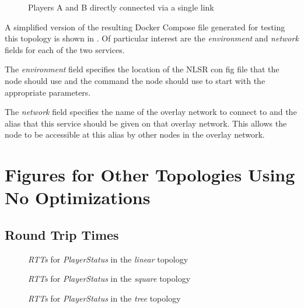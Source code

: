 \begin{appendices}
\begin{figure}[H]
    \centering
    \caption{Players A and B directly connected via a single link}
    \label{fig:app:docker-l2}
\end{figure}

A simplified version of the resulting Docker Compose file generated for testing this topology is shown in . Of particular interest are the \textit{environment} and \textit{network} fields for each of the two services. 

The \textit{environment} field specifies the location of the NLSR con fig file that the node should use and the command the node should use to start \game{} with the appropriate parameters.

The \textit{network} field specifies the name of the overlay network to connect to and the alias that this service should be given on that overlay network. This allows the node to be accessible at this alias by other nodes in the overlay network.







\chapter{Figures for Other Topologies Using No Optimizations}\label{app:eval:basic}
\section{Round Trip Times}
\begin{figure}[H]
    \centering
    \caption{\textit{RTTs} for \textit{PlayerStatus} in the \textit{linear} topology}
    \label{fig:app:rtt:linear}
\end{figure}

\begin{figure}[H]
    \centering
    \caption{\textit{RTTs} for \textit{PlayerStatus} in the \textit{square} topology}
    \label{fig:app:rtt:square}
\end{figure}

\begin{figure}[H]
    \centering
    \caption{\textit{RTTs} for \textit{PlayerStatus} in the \textit{tree} topology}
    \label{fig:app:rtt:tree}
\end{figure}


\end{appendices}
